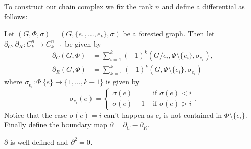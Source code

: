 To construct our chain complex we fix the rank $n$ and define a differential as follows:
\begin{definition}
	Let $(G,\Phi,\sigma) = (G, \{e_1,\ldots,e_{k}\},\sigma)$ be a forested graph. Then let $\partial_{C}, \partial_{R}: C_{k}^{n} \to C_{k-1}^{n}$ be given by
	\begin{align*}
		\partial_{C}(G,\Phi) &= \sum_{i = 1}^{k} (-1)^{k} (G / e_{i}, \Phi \setminus \{e_{i}\}, \sigma_{e_{i}}),\\
		\partial _{R}(G,\Phi) &= \sum_{k = 1}^{k} (-1)^{k} (G,\Phi \setminus \{e_{i}\}, \sigma_{e_{i}}) 
	\end{align*}
	where $\sigma_{e_{i}}: \Phi \ \{e\} \to \{1,\ldots,k-1\}$ is given by
	\[
		\sigma_{e_{i}}(e) = \begin{cases}
			\sigma(e) & \text{ if }\sigma(e) < i\\
			\sigma(e) - 1 & \text{ if } \sigma(e) > i
		\end{cases}
	.\]
	Notice that the case $\sigma(e) = i$ can't happen as $e_{i}$ is not contained in $\Phi \setminus \{e_{i}\}$. 
	Finally define the boundary map $\partial = \partial_{C} - \partial_{R}$.
\end{definition}

\begin{proposition}
	$\partial$ is well-defined and $\partial^2 = 0$.
\end{proposition}


